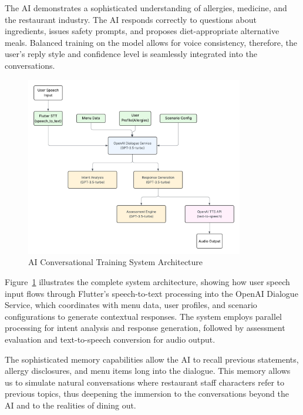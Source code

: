 \documentclass[MScCS]{uccthesis}
\begin{document}
The AI demonstrates a sophisticated understanding of allergies, medicine, and the restaurant industry. The AI responds correctly to questions about ingredients, issues safety prompts, and proposes diet-appropriate alternative meals. Balanced training on the model allows for voice consistency, therefore, the user's reply style and confidence level is seamlessly integrated into the conversations.

\begin{figure}[htbp]
    \centering
    \includegraphics[width=0.85\textwidth,height=0.4\textheight,keepaspectratio]{Figures/ai_conversational_training_architecture.png}
    \caption{AI Conversational Training System Architecture}
    \label{fig:ai-architecture}
\end{figure}
Figure~\ref{fig:ai-architecture} illustrates the complete system architecture, showing how user speech input flows through Flutter's speech-to-text processing into the OpenAI Dialogue Service, which coordinates with menu data, user profiles, and scenario configurations to generate contextual responses. The system employs parallel processing for intent analysis and response generation, followed by assessment evaluation and text-to-speech conversion for audio output.


The sophisticated memory capabilities allow the AI to recall previous statements, allergy disclosures, and menu items long into the dialogue. This memory allows us to simulate natural conversations where restaurant staff characters refer to previous topics, thus deepening the immersion to the conversations beyond the AI and to the realities of dining out.
\end{document}
